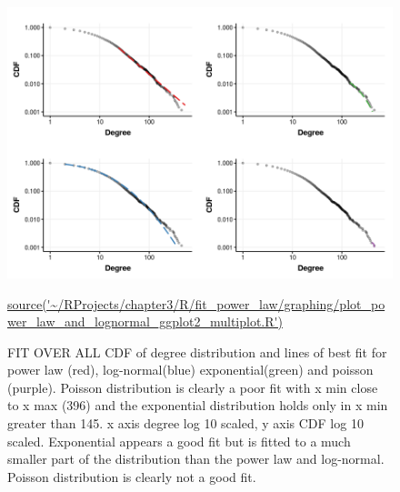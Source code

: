 
\begin{figure}
    \centering
    \includegraphics[width=\textwidth]{images/chapter3/poweRlaw/multiplot/Rplot_multiplot_with_x_min_each_distribution.png}
    \caption{FIT OVER ALL CDF of degree distribution and lines of best fit for power law (red), log-normal(blue) exponential(green) and poisson (purple). Poisson distribution is clearly a poor fit with x min close to x max (396) and the exponential distribution holds only in x min greater than 145. x axis degree log 10 scaled, y axis CDF log 10 scaled. Exponential appears a good fit but is fitted to a much smaller part of the distribution than the power law and log-normal. Poisson distribution is clearly not a good fit.}
    \small\url{source('~/RProjects/chapter3/R/fit_power_law/graphing/plot_power_law_and_lognormal_ggplot2_multiplot.R')}
    \label{fig:CDF degreel_multiplot}
\end{figure}




